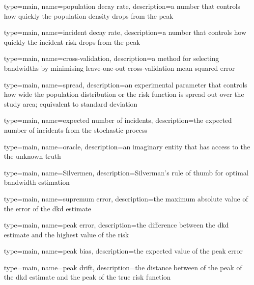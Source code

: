 

{%
   type=main,
   name={population decay rate},
   description={a number that controls how quickly the population density drops from the peak}
}

{%
   type=main,
   name={incident decay rate},
   description={a number that controls how quickly the incident risk drops from the peak}
}

 {
   type=main,
   name={cross-validation},
   description={a method for selecting bandwidths by minimising leave-one-out cross-validation mean squared error}
}

 {
   type=main,
   name={spread},
   description={an experimental parameter that controls how wide the population distribution or the risk function is spread out over the study area; equivalent to standard deviation}
}

{%
   type=main,
   name={expected number of incidents},
   description={the expected number of incidents from the stochastic process}
}

 {
   type=main,
   name={oracle},
   description={an imaginary entity that has access to the the unknown truth}
}

 {
   type=main,
   name={Silvermen},
   description={Silverman's rule of thumb for optimal bandwidth estimation}
}

{%
   type=main,
   name={supremum error},
   description={the maximum absolute value of the error of the dkd estimate}
}

{%
   type=main,
   name={peak error},
   description={the difference between the dkd estimate and the highest value of the risk}
}

{%
   type=main,
   name={peak bias},
   description={the expected value of the peak error}
}

{%
   type=main,
   name={peak drift},
   description={the distance between of the peak of the dkd estimate and the peak of the true risk function}
}

